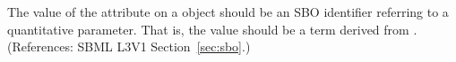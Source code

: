 The value of the  attribute on a \Parameter object should be
an SBO identifier referring to a quantitative parameter.  That is, the
value should be a term derived from \sboparameter.  (References: SBML
 L3V1 Section~\ref{sec:sbo}.)

